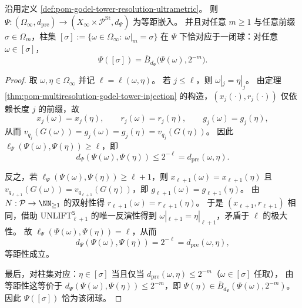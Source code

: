 \begin{theorem}\label{thm:pom-godel-steinitz-isometric-rigidity}
沿用定义 \ref{def:pom-godel-tower-resolution-ultrametric}。
则 \(\Psi:(\Omega_\infty,d_{\mathrm{pre}})\to (X_\infty\times \mathcal P^{\mathrm{St}},d_\Psi)\) 为等距嵌入。
并且对任意 \(m\ge 1\) 与任意前缀 \(\sigma\in\Omega_m\)，柱集
\(
[\sigma]:=\{\omega\in\Omega_\infty:\ \omega|_m=\sigma\}
\)
在 \(\Psi\) 下恰对应于一闭球：对任意 \(\omega\in[\sigma]\)，
\[
\Psi([\sigma])=\overline{B}_{d_\Psi}\bigl(\Psi(\omega),2^{-m}\bigr).
\]
\end{theorem}

\begin{proof}
取 \(\omega,\eta\in\Omega_\infty\) 并记 \(\ell=\ell(\omega,\eta)\)。
若 \(j\le \ell\)，则 \(\omega|_j=\eta|_j\)。
由定理 \ref{thm:pom-multiresolution-godel-tower-injection} 的构造，\((x_j(\cdot),r_j(\cdot))\) 仅依赖长度 \(j\) 的前缀，故
\[
x_j(\omega)=x_j(\eta),\qquad r_j(\omega)=r_j(\eta),
\qquad g_j(\omega)=g_j(\eta),
\]
从而
\(
v_{q_j}(G(\omega))=g_j(\omega)=g_j(\eta)=v_{q_j}(G(\eta))
\)。
因此 \(\ell_\Psi(\Psi(\omega),\Psi(\eta))\ge \ell\)，即
\[
d_\Psi(\Psi(\omega),\Psi(\eta))\le 2^{-\ell}=d_{\mathrm{pre}}(\omega,\eta).
\]
\par
反之，若 \(\ell_\Psi(\Psi(\omega),\Psi(\eta))\ge \ell+1\)，则 \(x_{\ell+1}(\omega)=x_{\ell+1}(\eta)\) 且
\(
v_{q_{\ell+1}}(G(\omega))=v_{q_{\ell+1}}(G(\eta))
\)，即 \(g_{\ell+1}(\omega)=g_{\ell+1}(\eta)\)。
由 \(N:\mathcal P\to\NN_{\ge 1}\) 的双射性得 \(r_{\ell+1}(\omega)=r_{\ell+1}(\eta)\)。
于是 \((x_{\ell+1},r_{\ell+1})\) 相同，借助 \(\mathrm{UNLIFT}^{\mathsf S}_{\ell+1}\) 的唯一反演性得到
\(
\omega|_{\ell+1}=\eta|_{\ell+1}
\)，矛盾于 \(\ell\) 的极大性。
故 \(\ell_\Psi(\Psi(\omega),\Psi(\eta))=\ell\)，从而
\[
d_\Psi(\Psi(\omega),\Psi(\eta))=2^{-\ell}=d_{\mathrm{pre}}(\omega,\eta),
\]
等距性成立。
\par
最后，对柱集对应：\(\eta\in[\sigma]\) 当且仅当 \(d_{\mathrm{pre}}(\omega,\eta)\le 2^{-m}\)（\(\omega\in[\sigma]\) 任取），
由等距性这等价于 \(d_\Psi(\Psi(\omega),\Psi(\eta))\le 2^{-m}\)，即 \(\Psi(\eta)\in \overline{B}_{d_\Psi}(\Psi(\omega),2^{-m})\)。
因此 \(\Psi([\sigma])\) 恰为该闭球。
\end{proof}


